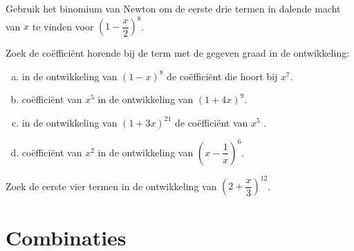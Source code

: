 \documentclass[12pt,twoside]{article}
\begin{document}
\begin{oefening}
Gebruik het binomium van Newton om de eerste drie termen in dalende macht van $x$ te vinden voor $\left(1-\dfrac{x}{2}\right)^8$.
\end{oefening}

\begin{oefening}
Zoek de coëfficiënt horende bij de term met de gegeven graad in de ontwikkeling:
\begin{enumerate}[(a)]
  \item in de ontwikkeling van $\left(1-x\right)^8$ de coëfficiënt die hoort bij $x^7$.
  \item coëfficiënt van $x^5$ in de ontwikkeling van $\left(1+4x\right)^9$.
  \item in de ontwikkeling van $\left(1+3x\right)^{21}$ de coëfficiënt van $x^5$ .
  \item coëfficiënt van $x^2$ in de ontwikkeling van $\left(x-\dfrac{1}{x}\right)^6$.
\end{enumerate}
\end{oefening}

\begin{oefening}
Zoek de eerste vier termen in de ontwikkeling van $\left(2+\dfrac{x}{3}\right)^{12}$.
\end{oefening}

\pagebreak
\section{Combinaties}
\end{document}

